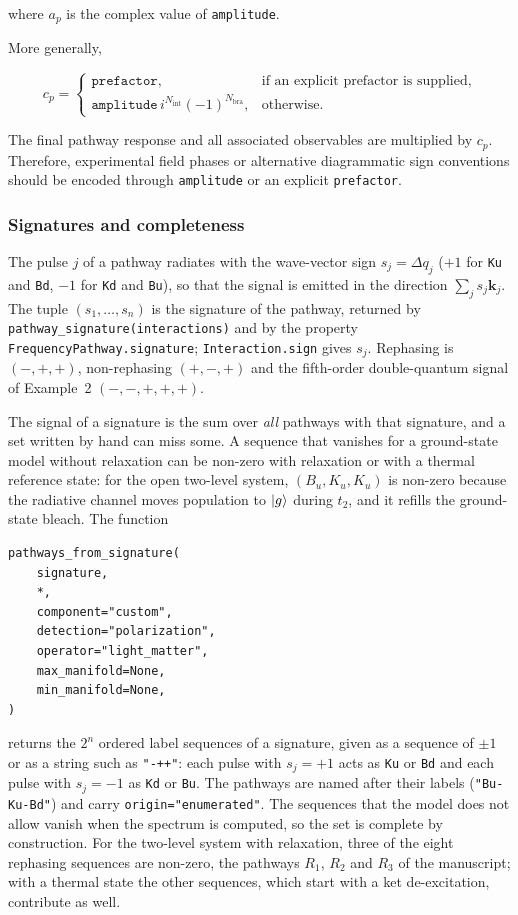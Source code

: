 \documentclass[11pt]{article}
\begin{document}
where \(a_p\) is the complex value of \texttt{amplitude}.

More generally,

\begin{equation}
c_p=
\begin{cases}
\texttt{prefactor},& \text{if an explicit prefactor is supplied},\\[4pt]
\texttt{amplitude}\, i^{N_{\mathrm{int}}} (-1)^{N_{\mathrm{bra}}},& \text{otherwise}.
\end{cases}
\end{equation}


The final pathway response and all associated observables are multiplied by
\(c_p\). Therefore, experimental field phases or alternative diagrammatic
sign conventions should be encoded through \texttt{amplitude} or an explicit
\texttt{prefactor}.

\subsubsection{Signatures and completeness}
\label{sec:signatures}

The pulse $j$ of a pathway radiates with the wave-vector sign $s_j=\Delta q_j$ ($+1$ for \texttt{Ku} and \texttt{Bd}, $-1$ for \texttt{Kd} and \texttt{Bu}), so that the signal is emitted in the direction $\sum_js_j\boldsymbol{k}_j$. The tuple $(s_1,\ldots,s_n)$ is the signature of the pathway, returned by \texttt{pathway\_signature(interactions)} and by the property \texttt{FrequencyPathway.signature}; \texttt{Interaction.sign} gives $s_j$. Rephasing is $(-,+,+)$, non-rephasing $(+,-,+)$ and the fifth-order double-quantum signal of Example~2 $(-,-,+,+,+)$.

The signal of a signature is the sum over \emph{all} pathways with that signature, and a set written by hand can miss some. A sequence that vanishes for a ground-state model without relaxation can be non-zero with relaxation or with a thermal reference state: for the open two-level system, $(B_u,K_u,K_u)$ is non-zero because the radiative channel moves population to $\ket{g}$ during $t_2$, and it refills the ground-state bleach. The function
\begin{verbatim}
pathways_from_signature(
    signature,
    *,
    component="custom",
    detection="polarization",
    operator="light_matter",
    max_manifold=None,
    min_manifold=None,
)
\end{verbatim}
returns the $2^n$ ordered label sequences of a signature, given as a sequence of $\pm1$ or as a string such as \texttt{"-++"}: each pulse with $s_j=+1$ acts as \texttt{Ku} or \texttt{Bd} and each pulse with $s_j=-1$ as \texttt{Kd} or \texttt{Bu}. The pathways are named after their labels (\texttt{"Bu-Ku-Bd"}) and carry \texttt{origin="enumerated"}. The sequences that the model does not allow vanish when the spectrum is computed, so the set is complete by construction. For the two-level system with relaxation, three of the eight rephasing sequences are non-zero, the pathways $R_1$, $R_2$ and $R_3$ of the manuscript; with a thermal state the other sequences, which start with a ket de-excitation, contribute as well.
\end{document}

